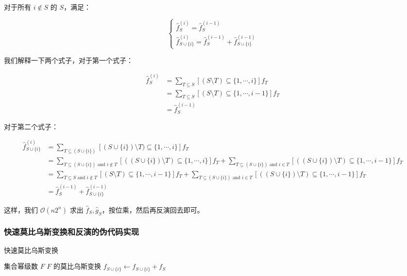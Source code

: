 \documentclass{article}
\begin{document}
对于所有 $i\notin S$ 的 $S$，满足：

$$
\begin{cases}
\hat f_S^{(i)}=\hat f_S^{(i-1)} \\
\hat f_{S\cup\{i\}}^{(i)}=\hat f_S^{(i-1)}+\hat f_{S\cup\{i\}}^{(i-1)}
\end{cases}
$$

我们解释一下两个式子，对于第一个式子：

$$
\begin{aligned}
\hat f_S^{(i)} &= \sum_{T \subseteq S}[(S \setminus T)\subseteq\{1,\cdots,i\}]f_T\\
               &= \sum_{T \subseteq S}[(S \setminus T)\subseteq\{1,\cdots,i-1\}]f_T\\
               &= \hat f_S^{(i-1)}
\end{aligned}
$$

对于第二个式子：

$$
\begin{aligned}
\hat f_{S\cup\{i\}}^{(i)} &= \sum_{T \subseteq (S\cup\{i\})}[(S\cup\{i\}) \setminus T)\subseteq\{1,\cdots,i\}]f_T\\
               &= \sum_{T \subseteq (S\cup\{i\}) \text{ and } i \notin T}[((S\cup\{i\}) \setminus T)\subseteq\{1,\cdots,i\}]f_T+\sum_{T \subseteq (S\cup\{i\}) \text{ and } i \in T}[((S\cup\{i\}) \setminus T)\subseteq\{1,\cdots,i-1\}]f_T\\
               &= \sum_{T \subseteq S \text{ and } i \notin T}[(S \setminus T)\subseteq\{1,\cdots,i-1\}]f_T+\sum_{T \subseteq (S\cup\{i\}) \text{ and } i \in T}[((S\cup\{i\}) \setminus T)\subseteq\{1,\cdots,i-1\}]f_T\\
               &= \hat f_S^{(i-1)}+\hat f_{S \cup \{i\}}^{(i-1)}
\end{aligned}
$$

这样，我们 $\mathcal{O}(n2^n)$ 求出 $\hat f_S,\hat g_S$，按位乘，然后再反演回去即可。


\subsubsection*{快速莫比乌斯变换和反演的伪代码实现}

\begin{algorithm}
    \caption{快速莫比乌斯变换}
    \begin{algorithmic}[1]
        \Require 集合幂级数 $F$
        \Ensure $F$ 的莫比乌斯变换
                    \State $f_{S \cup \{i\}} \gets f_{S \cup \{i\}} + f_{S}$
                \EndFor
            \EndFor
            \State {}
        \EndFunction
    \end{algorithmic}
\end{algorithm}
\end{document}
